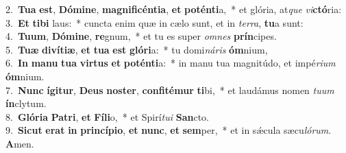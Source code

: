{2.~}\textbf{Tu}\textbf{a} \textbf{est}, \textbf{Dó}\textbf{mi}\textbf{ne}, \textbf{ma}\textbf{gni}\textbf{fi}\textbf{cén}\textbf{ti}\textbf{a}, \textbf{et} \textbf{po}\textbf{tén}\textbf{ti}a,~* et glória, at\textit{que} \textit{vi}\textbf{ctó}ria:\\
{3.~}\textbf{Et} \textbf{ti}\textbf{bi} laus:~* cuncta enim quæ in cælo sunt, et in \textit{ter}\textit{ra}, \textbf{tu}a sunt:\\
{4.~}\textbf{Tu}\textbf{um}, \textbf{Dó}\textbf{mi}\textbf{ne}, \textbf{re}gnum,~* et tu es super \textit{om}\textit{nes} \textbf{prín}cipes.\\
{5.~}\textbf{Tu}\textbf{æ} \textbf{di}\textbf{ví}\textbf{ti}\textbf{æ}, \textbf{et} \textbf{tu}\textbf{a} \textbf{est} \textbf{gló}\textbf{ri}a:~* tu domi\textit{ná}\textit{ris} \textbf{óm}nium,\\
{6.~}\textbf{In} \textbf{ma}\textbf{nu} \textbf{tu}\textbf{a} \textbf{vir}\textbf{tus} \textbf{et} \textbf{po}\textbf{tén}\textbf{ti}a:~* in manu tua magnitúdo, et impé\textit{ri}\textit{um} \textbf{óm}nium.\\
{7.~}\textbf{Nunc} \textbf{í}\textbf{gi}\textbf{tur}, \textbf{De}\textbf{us} \textbf{no}\textbf{ster}, \textbf{con}\textbf{fi}\textbf{té}\textbf{mur} \textbf{ti}bi,~* et laudámus nomen \textit{tu}\textit{um} \textbf{ín}clytum.\\
{8.~}\textbf{Gló}\textbf{ri}\textbf{a} \textbf{Pa}\textbf{tri}, \textbf{et} \textbf{Fí}\textbf{li}o,~* et Spirí\textit{tu}\textit{i} \textbf{San}cto.\\
{9.~}\textbf{Si}\textbf{cut} \textbf{e}\textbf{rat} \textbf{in} \textbf{prin}\textbf{cí}\textbf{pi}\textbf{o}, \textbf{et} \textbf{nunc}, \textbf{et} \textbf{sem}per,~* et in sǽcula sæcu\textit{ló}\textit{rum}. \textbf{A}men.\\
